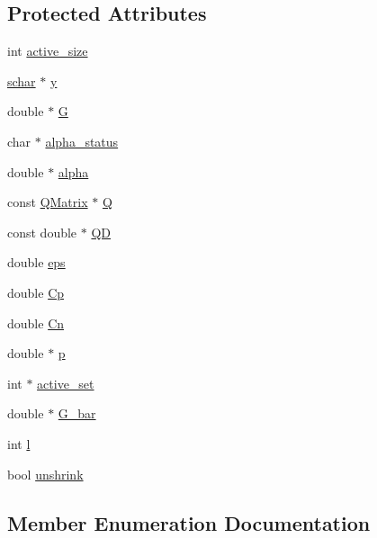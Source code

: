 \subsection*{Protected Attributes}
\begin{DoxyCompactItemize}
\item 
int \hyperlink{classSolver_a06ba1b87b3749cc545e573151b7beca0}{active\+\_\+size}
\item 
\hyperlink{svm__core_8cpp_a0fd9ce9d735064461bebfe6037026093}{schar} $\ast$ \hyperlink{classSolver_a3acc1043d06dedf87f054ff3eea5c426}{y}
\item 
double $\ast$ \hyperlink{classSolver_ad8ab27068f2e045591970aae1201afe9}{G}
\item 
char $\ast$ \hyperlink{classSolver_a9fe653e04c43956d5fb86635651b0003}{alpha\+\_\+status}
\item 
double $\ast$ \hyperlink{classSolver_a00d7a7cefa2504d41c7db6cd7cc6b428}{alpha}
\item 
const \hyperlink{classQMatrix}{Q\+Matrix} $\ast$ \hyperlink{classSolver_a2d3461718f0570bdc47f5dfb31d61e0a}{Q}
\item 
const double $\ast$ \hyperlink{classSolver_a7c7b7b1207983543855165e8eb249f2a}{QD}
\item 
double \hyperlink{classSolver_a718333cc2c1d40abf9c292a788cba1e5}{eps}
\item 
double \hyperlink{classSolver_a2e45dbea8be469bf8247e14768549dd5}{Cp}
\item 
double \hyperlink{classSolver_a38d741d194839fb445f982dd78e0b97b}{Cn}
\item 
double $\ast$ \hyperlink{classSolver_a882cce072f56679880d409e3e73f7ae8}{p}
\item 
int $\ast$ \hyperlink{classSolver_a6382277606a9b3df3d2f0ac947e1cde3}{active\+\_\+set}
\item 
double $\ast$ \hyperlink{classSolver_a89e58cf39a0415c9032b8ec2f4575dcc}{G\+\_\+bar}
\item 
int \hyperlink{classSolver_a88832d45b6de977b1cbb2afd4c0e494c}{l}
\item 
bool \hyperlink{classSolver_a62ded1c184aeb28f8dee04eb4a10530a}{unshrink}
\end{DoxyCompactItemize}


\subsection{Member Enumeration Documentation}
